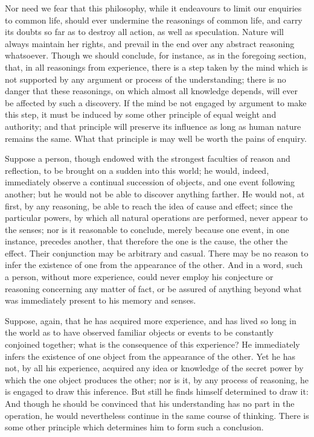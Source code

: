 \documentclass[]{article}
\begin{document}
\begin{sectionbody}
\humeparagraph  Nor need we fear that this philosophy, while it endeavours to limit our enquiries to common life, should ever undermine the reasonings of common life, and carry its doubts so far as to destroy all action, as well as speculation. Nature will always maintain her rights, and prevail in the end over any abstract reasoning whatsoever. Though we should conclude, for instance, as in the foregoing section, that, in all reasonings from experience, there is a step taken by the mind which is not supported by any argument or process of the understanding; there is no danger that these reasonings, on which almost all knowledge depends, will ever be affected by such a discovery. If the mind be not engaged by argument to make this step, it must be induced by some other principle of equal weight and authority; and that principle will preserve its influence as long as human nature remains the same. What that principle is may well be worth the pains of enquiry.

\humeparagraph  Suppose a person, though endowed with the strongest faculties of reason and reflection, to be brought on a sudden into this world; he would, indeed, immediately observe a continual succession of objects, and one event following another; but he would not be able to discover anything farther. He would not, at first, by any reasoning, be able to reach the idea of cause and effect; since the particular powers, by which all natural operations are performed, never appear to the senses; nor is it reasonable to conclude, merely because one event, in one instance, precedes another, that therefore the one is the cause, the other the effect. Their conjunction may be arbitrary and casual. There may be no reason to infer the existence of one from the appearance of the other. And in a word, such a person, without more experience, could never employ his conjecture or reasoning concerning any matter of fact, or be assured of anything beyond what was immediately present to his memory and senses.

\humeparagraph  Suppose, again, that he has acquired more experience, and has lived so long in the world as to have observed familiar objects or events to be constantly conjoined together; what is the consequence of this experience? He immediately infers the existence of one object from the appearance of the other. Yet he has not, by all his experience, acquired any idea or knowledge of the secret power by which the one object produces the other; nor is it, by any process of reasoning, he is engaged to draw this inference. But still he finds himself determined to draw it: And though he should be convinced that his understanding has no part in the operation, he would nevertheless continue in the same course of thinking. There is some other principle which determines him to form such a conclusion.


\end{sectionbody}
\end{document}
